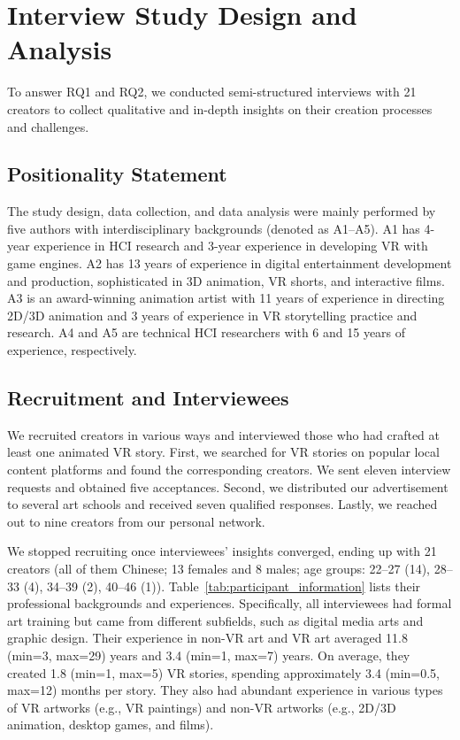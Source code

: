 \section{Interview Study Design and Analysis}
To answer RQ1 and RQ2, we conducted semi-structured interviews with 21 creators to collect qualitative and in-depth insights on their creation processes and challenges. 

\subsection{Positionality Statement}
The study design, data collection, and data analysis were mainly performed by five authors with interdisciplinary backgrounds (denoted as A1--A5). A1 has 4-year experience in HCI research and 3-year experience in developing VR with game engines. A2 has 13 years of experience in digital entertainment development and production, sophisticated in 3D animation, VR shorts, and interactive films. A3 is an award-winning animation artist with 11 years of experience in directing 2D/3D animation and 3 years of experience in VR storytelling practice and research. A4 and A5 are technical HCI researchers with 6 and 15 years of experience, respectively.

\subsection{Recruitment and Interviewees}
\label{sec:interview_recruitment}
We recruited creators in various ways and interviewed those who had crafted at least one animated VR story.
First, we searched for VR stories on popular local content platforms and found the corresponding creators. We sent eleven interview requests and obtained five acceptances. 
Second, we distributed our advertisement to several art schools and received seven qualified responses.
Lastly, we reached out to nine creators from our personal network.

We stopped recruiting once interviewees' insights converged, ending up with 21 creators (all of them Chinese; 13 females and 8 males; age groups: 22--27 (14), 28--33 (4), 34--39 (2), 40--46 (1)). Table~\ref{tab:participant_information} lists their professional backgrounds and experiences. Specifically, all interviewees had formal art training but came from different subfields, such as digital media arts and graphic design. Their experience in non-VR art and VR art averaged 11.8 (min=3, max=29) years and 3.4 (min=1, max=7) years. On average, they created 1.8 (min=1, max=5) VR stories, spending approximately 3.4 (min=0.5, max=12) months per story. 
They also had abundant experience in various types of VR artworks (e.g., VR paintings) and non-VR artworks (e.g., 2D/3D animation, desktop games, and films).

